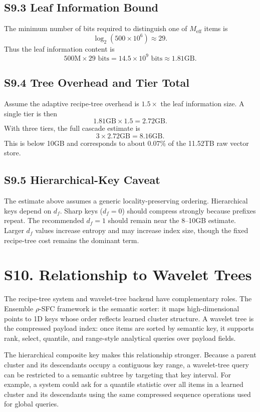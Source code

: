 \documentclass[11pt]{article}
\begin{document}
\subsection*{S9.3 Leaf Information Bound}
The minimum number of bits required to distinguish one of $M_{\mathrm{eff}}$ items is
\[
\log_2(500\times10^6)\approx29.
\]
Thus the leaf information content is
\[
500\mathrm{M}\times29\text{ bits}=14.5\times10^9\text{ bits}\approx1.81\text{GB}.
\]

\subsection*{S9.4 Tree Overhead and Tier Total}
Assume the adaptive recipe-tree overhead is $1.5\times$ the leaf information size. A single tier is then
\[
1.81\text{GB}\times1.5=2.72\text{GB}.
\]
With three tiers, the full cascade estimate is
\[
3\times2.72\text{GB}=8.16\text{GB}.
\]
This is below 10GB and corresponds to about $0.07\%$ of the 11.52TB raw vector store.

\subsection*{S9.5 Hierarchical-Key Caveat}
The estimate above assumes a generic locality-preserving ordering. Hierarchical keys depend on $d_f$. Sharp keys ($d_f=0$) should compress strongly because prefixes repeat. The recommended $d_f=1$ should remain near the 8--10GB estimate. Larger $d_f$ values increase entropy and may increase index size, though the fixed recipe-tree cost remains the dominant term.

\section*{S10. Relationship to Wavelet Trees}
\label{sec:si-wavelet}

The recipe-tree system and wavelet-tree backend have complementary roles. The Ensemble $\rho$-SFC framework is the semantic sorter: it maps high-dimensional points to 1D keys whose order reflects learned cluster structure. A wavelet tree is the compressed payload index: once items are sorted by semantic key, it supports rank, select, quantile, and range-style analytical queries over payload fields.

The hierarchical composite key makes this relationship stronger. Because a parent cluster and its descendants occupy a contiguous key range, a wavelet-tree query can be restricted to a semantic subtree by targeting that key interval. For example, a system could ask for a quantile statistic over all items in a learned cluster and its descendants using the same compressed sequence operations used for global queries.
\end{document}
